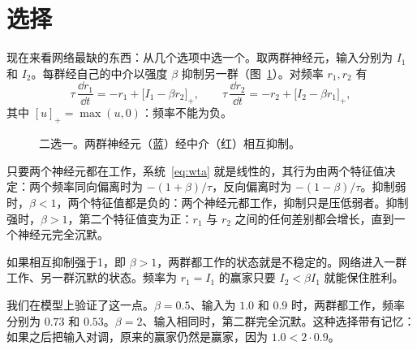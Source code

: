 \section{选择}

现在来看网络最缺的东西：从几个选项中选一个。取两群神经元，输入分别为 $I_1$ 和 $I_2$。每群经自己的中介以强度 $\beta$ 抑制另一群（图~\ref{fig:wta}）。对频率 $r_1,r_2$ 有
\begin{equation}
\tau\,\frac{\dd r_1}{\dd t} = -r_1 + \bigl[I_1-\beta r_2\bigr]_+ ,\qquad
\tau\,\frac{\dd r_2}{\dd t} = -r_2 + \bigl[I_2-\beta r_1\bigr]_+ ,
\label{eq:wta}
\end{equation}
其中 $[u]_+=\max(u,0)$：频率不能为负。

\begin{figure}[t]
\centering
{}
\caption{二选一。两群神经元（蓝）经中介（红）相互抑制。}
\label{fig:wta}
\end{figure}

只要两个神经元都在工作，系统~\eqref{eq:wta} 就是线性的，其行为由两个特征值决定：两个频率同向偏离时为 $-(1+\beta)/\tau$，反向偏离时为 $-(1-\beta)/\tau$。抑制弱时，$\beta<1$，两个特征值都是负的：两个神经元都工作，抑制只是压低弱者。抑制强时，$\beta>1$，第二个特征值变为正：$r_1$ 与 $r_2$ 之间的任何差别都会增长，直到一个神经元完全沉默。

\begin{keyblock}
\begin{proposition}[赢者通吃]
\label{prop:wta}
如果相互抑制强于1，即 $\beta>1$，两群都工作的状态就是不稳定的。网络进入一群工作、另一群沉默的状态。频率为 $r_1=I_1$ 的赢家只要 $I_2<\beta I_1$ 就能保住胜利。
\end{proposition}
\end{keyblock}

我们在模型上验证了这一点。$\beta=0.5$、输入为 $1.0$ 和 $0.9$ 时，两群都工作，频率分别为 $0.73$ 和 $0.53$。$\beta=2$、输入相同时，第二群完全沉默。这种选择带有记忆：如果之后把输入对调，原来的赢家仍然是赢家，因为 $1.0<2\cdot0.9$。


